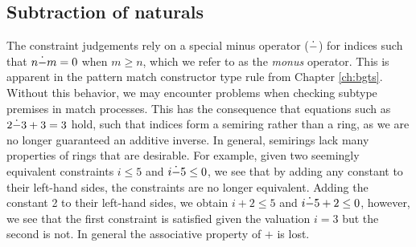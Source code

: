 \subsection{Subtraction of naturals}
The constraint judgements rely on a special minus operator ($\dot -$) for indices such that $n \dot - m=0$ when $m \geq n$, which we refer to as the \textit{monus} operator. This is apparent in the pattern match constructor type rule from Chapter \ref{ch:bgts}. Without this behavior, we may encounter problems when checking subtype premises in match processes. This has the consequence that equations such as $2\dot - 3+3=3$ hold, such that indices form a semiring rather than a ring, as we are no longer guaranteed an additive inverse. In general, semirings lack many properties of rings that are desirable. For example, given two seemingly equivalent constraints $i \leq 5$ and $i \dot - 5 \leq 0$, we see that by adding any constant to their left-hand sides, the constraints are no longer equivalent. Adding the constant 2 to their left-hand sides, we obtain $i + 2 \leq 5$ and $i \dot - 5 + 2 \leq 0$, however, we see that the first constraint is satisfied given the valuation $i = 3$ but the second is not. In general the associative property of $+$ is lost.\\

